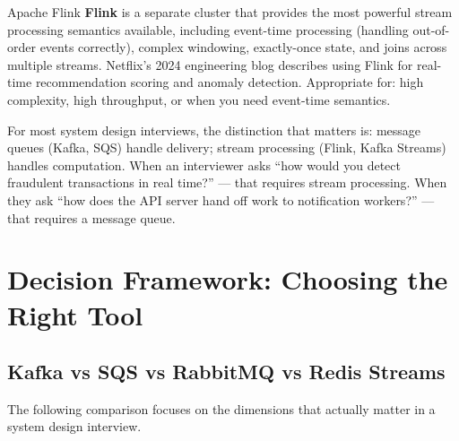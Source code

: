 \documentclass[11pt,a4paper]{article}
\begin{document}
\begin{termbox}{Apache Flink}
\textbf{Flink} is a separate cluster that provides the most powerful stream processing semantics available, including event-time processing (handling out-of-order events correctly), complex windowing, exactly-once state, and joins across multiple streams. Netflix's 2024 engineering blog describes using Flink for real-time recommendation scoring and anomaly detection. Appropriate for: high complexity, high throughput, or when you need event-time semantics.
\end{termbox}

For most system design interviews, the distinction that matters is: message queues (Kafka, SQS) handle delivery; stream processing (Flink, Kafka Streams) handles computation. When an interviewer asks ``how would you detect fraudulent transactions in real time?'' --- that requires stream processing. When they ask ``how does the API server hand off work to notification workers?'' --- that requires a message queue.

\section{Decision Framework: Choosing the Right Tool}

\subsection{Kafka vs SQS vs RabbitMQ vs Redis Streams}

The following comparison focuses on the dimensions that actually matter in a system design interview.
\end{document}
